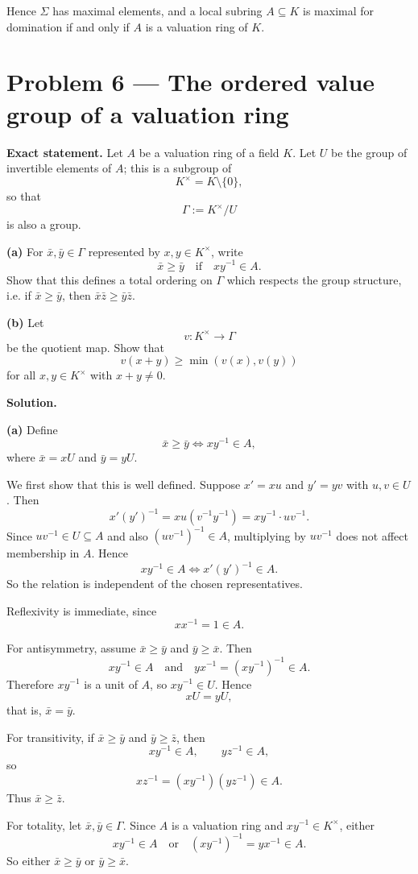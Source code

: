 \documentclass[12pt,a4paper,oneside]{report}
\theoremstyle{notespace}
\begin{document}
Hence \(\Sigma\) has maximal elements, and a local subring \(A\subseteq K\) is maximal for domination if and only if \(A\) is a valuation ring of \(K\).

\section{Problem 6 --- The ordered value group of a valuation ring}

\textbf{Exact statement.}
Let \(A\) be a valuation ring of a field \(K\). Let \(U\) be the group of invertible elements of \(A\); this is a subgroup of
\[
K^\times=K\setminus\{0\},
\]
so that
\[
\Gamma:=K^\times/U
\]
is also a group.

\textbf{(a)} For \(\bar x,\bar y\in \Gamma\) represented by \(x,y\in K^\times\), write
\[
\bar x\ge \bar y \quad\text{if}\quad xy^{-1}\in A.
\]
Show that this defines a total ordering on \(\Gamma\) which respects the group structure, i.e. if \(\bar x\ge \bar y\), then \(\bar x\bar z\ge \bar y\bar z\).

\textbf{(b)} Let
\[
v:K^\times\to \Gamma
\]
be the quotient map. Show that
\[
v(x+y)\ge \min(v(x),v(y))
\]
for all \(x,y\in K^\times\) with \(x+y\neq 0\).

\textbf{Solution.}

\textbf{(a)} Define
\[
\bar x\ge \bar y \iff xy^{-1}\in A,
\]
where \(\bar x=xU\) and \(\bar y=yU\).

We first show that this is well defined. Suppose \(x'=xu\) and \(y'=yv\) with \(u,v\in U\). Then
\[
x'(y')^{-1}=xu(v^{-1}y^{-1})=xy^{-1}\cdot uv^{-1}.
\]
Since \(uv^{-1}\in U\subseteq A\) and also \((uv^{-1})^{-1}\in A\), multiplying by \(uv^{-1}\) does not affect membership in \(A\). Hence
\[
xy^{-1}\in A \iff x'(y')^{-1}\in A.
\]
So the relation is independent of the chosen representatives.

Reflexivity is immediate, since
\[
xx^{-1}=1\in A.
\]

For antisymmetry, assume \(\bar x\ge \bar y\) and \(\bar y\ge \bar x\). Then
\[
xy^{-1}\in A
\quad\text{and}\quad
yx^{-1}=(xy^{-1})^{-1}\in A.
\]
Therefore \(xy^{-1}\) is a unit of \(A\), so \(xy^{-1}\in U\). Hence
\[
xU=yU,
\]
that is, \(\bar x=\bar y\).

For transitivity, if \(\bar x\ge \bar y\) and \(\bar y\ge \bar z\), then
\[
xy^{-1}\in A,\qquad yz^{-1}\in A,
\]
so
\[
xz^{-1}=(xy^{-1})(yz^{-1})\in A.
\]
Thus \(\bar x\ge \bar z\).

For totality, let \(\bar x,\bar y\in \Gamma\). Since \(A\) is a valuation ring and \(xy^{-1}\in K^\times\), either
\[
xy^{-1}\in A
\quad\text{or}\quad
(xy^{-1})^{-1}=yx^{-1}\in A.
\]
So either \(\bar x\ge \bar y\) or \(\bar y\ge \bar x\).
\end{document}
